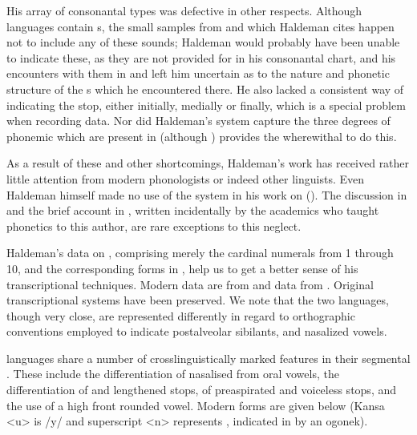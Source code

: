\documentclass[output=paper]{LSP/langsci}
\begin{document}
His array of consonantal types was defective in other respects. Although  languages contain s, the small samples from  and  which Haldeman cites happen not to include any of these sounds; Haldeman would probably have been unable to indicate these, as they are not provided for in his consonantal chart, and his encounters with them in  and  left him uncertain as to the nature and phonetic structure of the s which he encountered there.  He also lacked a consistent way of indicating the  stop, either initially, medially or finally, which is a special problem when recording  data. Nor did Haldeman's system capture the three degrees of phonemic  which are present in  (although \citealt[80, \S353--355]{Haldeman1860}) provides the wherewithal to do this.  

As a result of these and other shortcomings, Haldeman's work has received rather little attention from modern phonologists or indeed other linguists.  Even Haldeman himself made no use of the system in his work on  (\citealt{Haldeman1872}).  The discussion in \citet{Pilling1887} and the brief account in \citet{KellyLocal1989}, written incidentally by the academics who taught phonetics to this author, are  rare exceptions to this neglect.   

Haldeman's data on , comprising merely the cardinal numerals from 1 through 10, and the corresponding forms in , help us to get a better sense of his transcriptional techniques. Modern  data are from \citet{Quintero2009} and  data from \citet{CumberlandRankin2012}.  Original transcriptional systems have been preserved. We note that the two languages, though very close, are represented differently in regard to orthographic conventions employed to indicate postalveolar sibilants,  and nasalized vowels. 

 languages share a number of crosslinguistically marked features in their segmental .  These include the differentiation of nasalised from oral vowels, the differentiation of  and lengthened stops, of preaspirated and voiceless  stops, and the use of a high front rounded vowel. Modern forms are given below (Kansa <u> is /y/ and superscript <n> represents , indicated in  by an ogonek).
\end{document}
